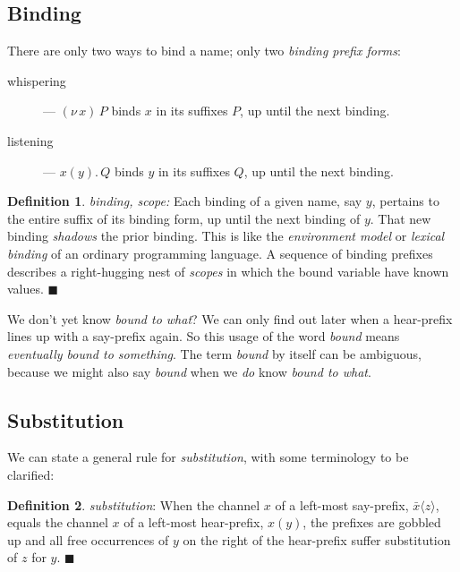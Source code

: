 \documentclass[10pt,oneside,x11names]{article}
\newcommand\listening  [3]{#1(#2).\,#3}
\newcommand\whispering [2]{(\nu\,#1)\,{#2}}
\theoremstyle{definition}
\newtheorem{definition}{Definition}
\theoremstyle{warning}
\begin{document}
\newpage
\subsection{Binding}
\label{sec:org059eca4}

There are only two ways to bind a name; only two \emph{binding prefix forms}:

\begin{description}
\item[{whispering}] --- \(\whispering{x}{P}\) binds \(x\) in its suffixes
\(P\), up until the next binding.

\item[{listening}] --- \(\listening{x}{y}{Q}\) binds \(y\) in its suffixes
\(Q\), up until the next binding.
\end{description}

\label{def:binding}
\begin{definition}{\emph{binding, scope:}}
  Each binding of a given name, say $y$, pertains to the entire
  suffix of its binding form, up until the next binding of $y$.
  That new binding
  \emph{shadows} the prior binding. This is like  the
  \emph{environment model} or \emph{lexical binding} of an
  ordinary programming language.
  A sequence of binding prefixes describes a right-hugging
  nest of \emph{scopes} in which the bound variable have known values.
  $\blacksquare$
\end{definition}

We don't yet know \emph{bound to what}? We can only find out later when
a hear-prefix lines up with a say-prefix again. So this usage of
the word \emph{bound} means \emph{eventually bound to something}. The term
\emph{bound} by itself can be ambiguous, because we might also say
\emph{bound} when we \emph{do} know \emph{bound to what}.

\subsection{Substitution}
\label{sec:org2059c3b}

We can state a general rule for \emph{substitution}, with some
terminology to be clarified:

\label{def:substitution}
\begin{definition}{\emph{substitution}:}
  When the channel $x$ of a left-most say-prefix, $\bar{x}\langle{z}\rangle$,
  equals the channel $x$ of a left-most hear-prefix, $x(y)$, the prefixes
  are gobbled up and all free occurrences of $y$ on the
  right of the hear-prefix suffer substitution of $z$ for $y$.
  $\blacksquare$
\end{definition}
\end{document}
